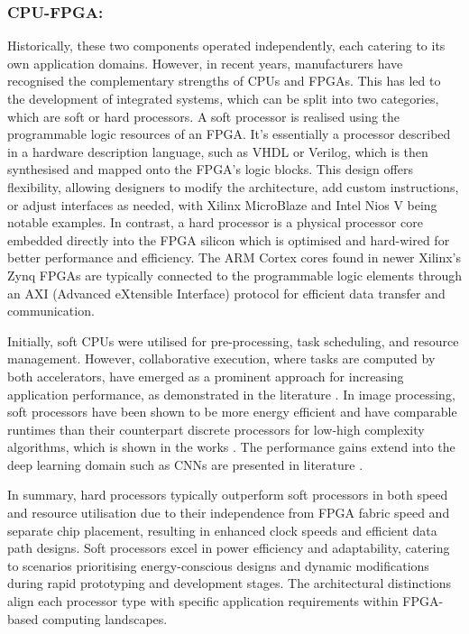 \subsubsection{CPU-FPGA:}
Historically, these two components operated independently, each catering to its own application domains. However, in recent years, manufacturers have recognised the complementary strengths of CPUs and FPGAs. This has led to the development of integrated systems, which can be split into two categories, which are soft or hard processors. A soft processor is realised using the programmable logic resources of an FPGA. It's essentially a processor described in a hardware description language, such as VHDL or Verilog, which is then synthesised and mapped onto the FPGA's logic blocks. This design offers flexibility, allowing designers to modify the architecture, add custom instructions, or adjust interfaces as needed, with Xilinx MicroBlaze\cite{AMD_2023} and Intel Nios V\cite{Intel_2023} being notable examples. In contrast, a hard processor is a physical processor core embedded directly into the FPGA silicon which is optimised and hard-wired for better performance and efficiency. The ARM Cortex cores found in newer Xilinx's Zynq FPGAs\cite{AMDSoftProcess} are typically connected to the programmable logic elements through an AXI (Advanced eXtensible Interface) protocol for efficient data transfer and communication. 

Initially, soft CPUs were utilised for pre-processing, task scheduling, and resource management. However, collaborative execution, where tasks are computed by both accelerators, have emerged as a prominent approach for increasing application performance, as demonstrated in the literature \cite{HuaChEL19, RajDarSum23, YiaRos05}. In image processing, soft processors have been shown to be more energy efficient and have comparable runtimes than their counterpart discrete processors for low-high complexity algorithms, which is shown in the works \cite{SidAmmin19,CheCha10,HonOlePol14}. The performance gains extend into the deep learning domain such as CNNs are presented in literature \cite{MelCapDeri28,ZhaPra17,zenpras20,MossNurSim17}.

In summary, hard processors typically outperform soft processors in both speed and resource utilisation due to their independence from FPGA fabric speed and separate chip placement, resulting in enhanced clock speeds and efficient data path designs. Soft processors excel in power efficiency and adaptability, catering to scenarios prioritising energy-conscious designs and dynamic modifications during rapid prototyping and development stages. The architectural distinctions align each processor type with specific application requirements within FPGA-based computing landscapes.


